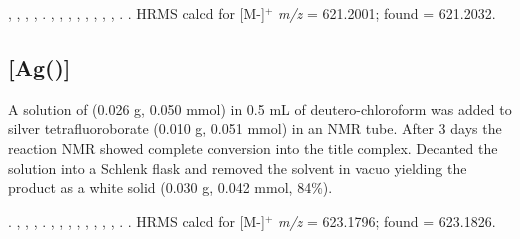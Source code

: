 ,
,
,
,
.
,
,
,
,
,
,
, %
,
.
.
HRMS calcd for  [M-]$^+$ \emph{m/z} = 621.2001; found = 621.2032.



\subsection*{\texorpdfstring{[Ag(\tButhixantphos)]} A}


A solution of \tButhixantphos{} (0.026 g, 0.050 mmol) in 0.5 mL of deutero-chloroform was added to silver tetrafluoroborate (0.010 g, 0.051 mmol) in an NMR tube.  After 3 days the reaction NMR showed complete conversion into the title complex.  Decanted the solution into a Schlenk flask and removed the solvent in vacuo yielding the product as a white solid (0.030 g, 0.042 mmol, 84\%).

.
,
,
,
.
,
,
,
,
,
, %
,
,
.
.
HRMS calcd for  [M-]$^+$ \emph{m/z} = 623.1796; found = 623.1826.

